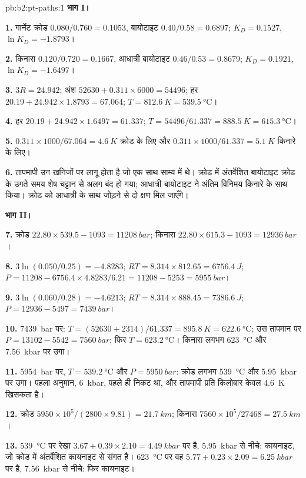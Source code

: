 \begin{solution}{pb:b2:pt-paths:1}
\noindent\textbf{भाग I।}

\textbf{1.} गार्नेट क्रोड $0.080/0.760 = 0.1053$, बायोटाइट $0.40/0.58 = 0.6897$; $K_D =
0.1527$, $\ln K_D = -1.8793$।

\textbf{2.} किनारा $0.120/0.720 = 0.1667$, आधात्री बायोटाइट $0.46/0.53 = 0.8679$; $K_D =
0.1921$, $\ln K_D = -1.6497$।

\textbf{3.} $3R = 24.942$; अंश $52630 + 0.311\times6000 = 54496$; हर $20.19
+ 24.942\times1.8793 = 67.064$; $T = \qty{812.6}{K} = \qty{539.5}{\celsius}$।

\textbf{4.} हर $20.19 + 24.942\times1.6497 = 61.337$; $T = 54496/61.337 =
\qty{888.5}{K} = \qty{615.3}{\celsius}$।

\textbf{5.} $0.311\times1000/67.064 = \qty{4.6}{K}$ क्रोड के लिए और $0.311\times1000/61.337
= \qty{5.1}{K}$ किनारे के लिए।

\textbf{6.} तापमापी उन खनिजों पर लागू होता है जो एक साथ साम्य में थे।
क्रोड में अंतर्वेशित बायोटाइट क्रोड के उगते समय शेष चट्टान से अलग बंद हो गया;
आधात्री बायोटाइट ने अंतिम विनिमय किनारे के साथ किया। क्रोड को आधात्री के साथ जोड़ने से
दो क्षण मिल जाएँगे।

\noindent\textbf{भाग II।}

\textbf{7.} क्रोड $22.80\times539.5 - 1093 = \qty{11208}{bar}$; किनारा $22.80\times615.3 -
1093 = \qty{12936}{bar}$।

\textbf{8.} $3\ln(0.050/0.25) = -4.8283$; $RT = 8.314\times812.65 = \qty{6756.4}{J}$; $P =
11208 - 6756.4\times4.8283/6.21 = 11208 - 5253 = \qty{5955}{bar}$।

\textbf{9.} $3\ln(0.060/0.28) = -4.6213$; $RT = 8.314\times888.45 = \qty{7386.6}{J}$; $P
= 12936 - 5497 = \qty{7439}{bar}$।

\textbf{10.} \qty{7439}{bar} पर: $T = (52630 + 2314)/61.337 = \qty{895.8}{K} =
\qty{622.6}{\celsius}$; उस तापमान पर $P = 13102 - 5542 = \qty{7560}{bar}$; फिर $T
= \qty{623.2}{\celsius}$। किनारा लगभग \qty{623}{\celsius} और \qty{7.56}{kbar} पर उगा।

\textbf{11.} \qty{5954}{bar} पर, $T = \qty{539.2}{\celsius}$ और $P = \qty{5950}{bar}$:
क्रोड लगभग \qty{539}{\celsius} और \qty{5.95}{kbar} पर उगा। पहला अनुमान,
\qty{6}{kbar}, पहले ही निकट था, और तापमापी प्रति किलोबार केवल \qty{4.6}{K} खिसकता है।

\textbf{12.} क्रोड $5950\times10^5/(2800\times9.81) = \qty{21.7}{km}$; किनारा
$7560\times10^5/27468 = \qty{27.5}{km}$।

\textbf{13.} \qty{539}{\celsius} पर रेखा $3.67 + 0.39\times2.10 =
\qty{4.49}{kbar}$ पर है, \qty{5.95}{kbar} से नीचे: कायनाइट, जो क्रोड में अंतर्वेशित कायनाइट से
संगत है। \qty{623}{\celsius} पर वह $5.77 + 0.23\times2.09 = \qty{6.25}{kbar}$ पर है,
\qty{7.56}{kbar} से नीचे: फिर कायनाइट।


\end{solution}
